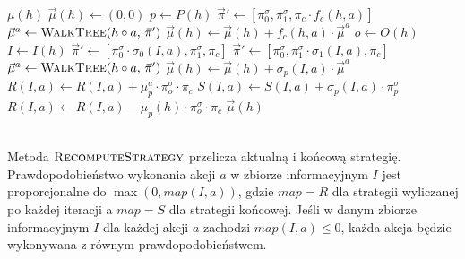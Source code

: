 \documentclass[magisterska]{pracamgr}
\begin{document}
\begin{algorithmic}
            \State \Return $\mu(h)$
        \EndIf
        \State $\vec{\mu}(h) \gets (0, 0)$ 
        \State $p \gets P(h)$
                \State $\vec{\pi}' \gets [\pi_0^{\sigma}, \pi_1^{\sigma}, \pi_c \cdot f_c(h, a)]$
                \State $\vec{\mu}^a \gets \Call{WalkTree}{h \circ a, \, \vec{\pi}'}$
                \State $\vec{\mu}(h) \gets \vec{\mu}(h) + f_c(h, a) \cdot \vec{\mu}^a$
            \EndFor
        \Else
            \State $o \gets O(h)$
            \State $I \gets I(h)$
                    \State $\vec{\pi}' \gets [\pi_0^{\sigma} \cdot \sigma_0(I, a), \pi_1^{\sigma}, \pi_c]$
                \Else
                    \State $\vec{\pi}' \gets [\pi_0^{\sigma}, \pi_1^{\sigma} \cdot \sigma_1(I, a), \pi_c]$
                \EndIf
                \State $\vec{\mu}^a \gets \Call{WalkTree}{h \circ a, \, \vec{\pi}'}$
                \State $\vec{\mu}(h) \gets \vec{\mu}(h) + \sigma_p(I, a) \cdot \vec{\mu}^a$
                \State $R(I, a) \gets R(I, a) + \mu_p^a \cdot \pi_{o}^{\sigma} \cdot \pi_c $
                \State $S(I, a) \gets S(I, a) + \sigma_p(I, a) \cdot \pi_{p}^{\sigma}$
            \EndFor
                \State $R(I, a) \gets R(I, a) - \mu_p(h) \cdot \pi_{o}^{\sigma} \cdot \pi_c $
            \EndFor
        \EndIf
    \State \Return $\vec{\mu}(h)$
    \EndFunction
\end{algorithmic}


$\,$ \\
Metoda $\Call{RecomputeStrategy}{}$ przelicza aktualną i końcową strategię. Prawdopodobieństwo wykonania akcji $a$
w zbiorze informacyjnym $I$ jest proporcjonalne do $\max(0, map(I, a))$, gdzie $map=R$ dla strategii
wyliczanej po każdej iteracji a $map=S$ dla strategii końcowej. Jeśli w danym zbiorze informacyjnym $I$ dla każdej
akcji $a$ zachodzi $map(I, a) \leq 0$, każda akcja będzie wykonywana z równym prawdopodobieństwem. \\
\end{document}
